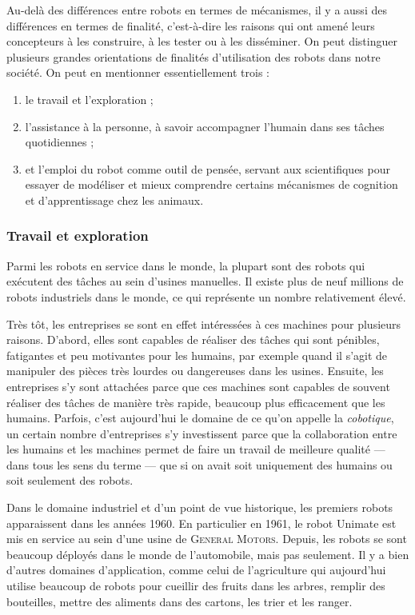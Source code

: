 Au-delà des différences entre robots en termes de mécanismes, il y a aussi des différences en termes de finalité, c'est-à-dire les raisons qui ont amené leurs concepteurs à les construire, à les tester ou à les disséminer. On peut distinguer plusieurs grandes orientations de finalités d'utilisation des robots dans notre société. On peut en mentionner essentiellement trois :
\begin{enumerate}
\item le travail et l'exploration ;
\item l'assistance à la personne, à savoir accompagner l'humain dans ses tâches quotidiennes ;
\item et l'emploi du robot comme outil de pensée, servant aux scientifiques pour essayer de modéliser et mieux comprendre certains mécanismes de cognition et d'apprentissage chez les animaux.
\end{enumerate}

\subsubsection[Travail et exploration]{Travail et exploration}
\label{subsub:III.2.2.1}

Parmi les robots en service dans le monde, la plupart sont des robots qui exécutent des tâches au sein d'usines manuelles. Il existe plus de neuf millions de robots industriels dans le monde, ce qui représente un nombre relativement élevé.

Très tôt, les entreprises se sont en effet intéressées à ces machines pour plusieurs raisons. D'abord, elles sont capables de réaliser des tâches qui sont pénibles, fatigantes et peu motivantes pour les humains, par exemple quand il s'agit de manipuler des pièces très lourdes ou dangereuses dans les usines. Ensuite, les entreprises s'y sont attachées parce que ces machines sont capables de souvent réaliser des tâches de manière très rapide, beaucoup plus efficacement que les humains. Parfois, c'est aujourd'hui le domaine de ce qu'on appelle la \emph{cobotique}, un certain nombre d'entreprises s'y investissent parce que la collaboration entre les humains et les machines permet de faire un travail de meilleure qualité --- dans tous les sens du terme --- que si on avait soit uniquement des humains ou soit seulement des robots. 

Dans le domaine industriel et d'un point de vue historique, les premiers robots apparaissent dans les années 1960. En particulier en 1961, le robot Unimate est mis en service au sein d'une usine de \textsc{General Motors}. Depuis, les robots se sont beaucoup déployés dans le monde de l'automobile, mais pas seulement. Il y a bien d'autres domaines d'application, comme celui de l'agriculture qui aujourd'hui utilise beaucoup de robots pour cueillir des fruits dans les arbres, remplir des bouteilles, mettre des aliments dans des cartons, les trier et les ranger. 


